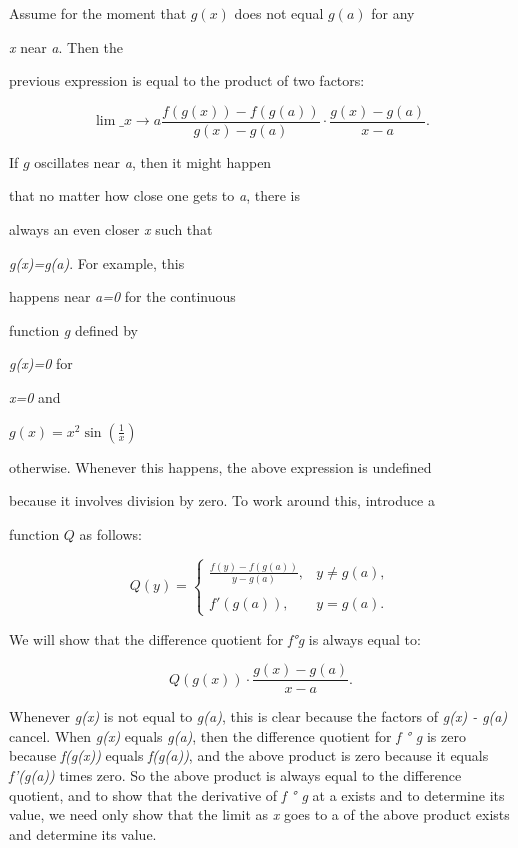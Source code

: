 {Assume for the moment that $g(x)\!$ does not equal $g(a)$ for any

\textit{x} near \textit{a}. Then the

previous expression is equal to the product of two factors:



$$\lim\_{x \to a} \frac{f(g(x)) - f(g(a))}{g(x) - g(a)} \cdot \frac{g(x) - g(a)}{x - a}.$$



If $g$ oscillates near \textit{a}, then it might happen

that no matter how close one gets to \textit{a}, there is

always an even closer \textit{x} such that

\textit{g(x)=g(a)}. For example, this

happens near \textit{a=0} for the continuous

function \textit{g} defined by

\textit{g(x)=0} for

\textit{x=0} and

\textit{$g(x)=x^2 \sin(\frac{1}{x})$}

otherwise. Whenever this happens, the above expression is undefined

because it involves division by zero. To work around this, introduce a

function $Q$ as follows:



$$Q(y) = 

\begin{cases}

\frac{f(y) - f(g(a))}{y - g(a)}, & y \neq g(a), \\\\ f'(g(a)), & y = g(a).

\end{cases}$$ 



We will show that the difference quotient for \textit{f°g} is always equal to:



$$Q(g(x)) \cdot \frac{g(x) - g(a)}{x - a}.$$



Whenever \textit{g(x)} is not equal to \textit{g(a)}, this is clear because the factors of \textit{g(x) - g(a)} cancel. When \textit{g(x)} equals \textit{g(a)}, then the difference quotient for \textit{f ° g} is zero because \textit{f(g(x))} equals \textit{f(g(a))}, and the above product is zero because it equals \textit{f'(g(a))} times zero. So the above product is always equal to the difference quotient, and to show that the derivative of \textit{f ° g} at a exists and to determine its value, we need only show that the limit as \textit{x} goes to a of the above product exists and determine its value.



}
